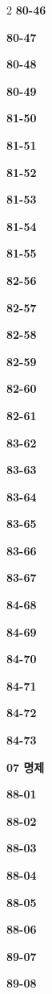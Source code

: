 \documentclass[10pt,a4paper]{article}
\begin{document}
\begin{multicols}{2}
\noindent\textbf{80-46}\ \par
\noindent\textbf{80-47}\ \par
\noindent\textbf{80-48}\ \par
\noindent\textbf{80-49}\ \par
\noindent\textbf{81-50}\ \par
\noindent\textbf{81-51}\ \par
\noindent\textbf{81-52}\ \par
\noindent\textbf{81-53}\ \par
\noindent\textbf{81-54}\ \par
\noindent\textbf{81-55}\ \par
\noindent\textbf{82-56}\ \par
\noindent\textbf{82-57}\ \par
\noindent\textbf{82-58}\ \par
\noindent\textbf{82-59}\ \par
\noindent\textbf{82-60}\ \par
\noindent\textbf{82-61}\ \par
\noindent\textbf{83-62}\ \par
\noindent\textbf{83-63}\ \par
\noindent\textbf{83-64}\ \par
\noindent\textbf{83-65}\ \par
\noindent\textbf{83-66}\ \par
\noindent\textbf{83-67}\ \par
\noindent\textbf{84-68}\ \par
\noindent\textbf{84-69}\ \par
\noindent\textbf{84-70}\ \par
\noindent\textbf{84-71}\ \par
\noindent\textbf{84-72}\ \par
\noindent\textbf{84-73}\ \par
\noindent\textbf{07 명제}\par\smallskip
\noindent\textbf{88-01}\ \par
\noindent\textbf{88-02}\ \par
\noindent\textbf{88-03}\ \par
\noindent\textbf{88-04}\ \par
\noindent\textbf{88-05}\ \par
\noindent\textbf{88-06}\ \par
\noindent\textbf{89-07}\ \par
\noindent\textbf{89-08}\ \par

\end{multicols}
\end{document}
